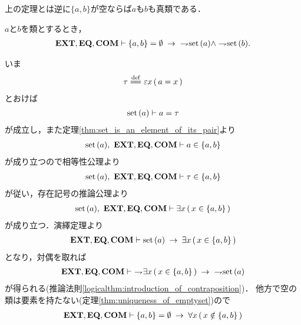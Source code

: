 	上の定理とは逆に$\{a,b\}$が空ならば$a$も$b$も真類である．
	
	\begin{screen}
		\begin{thm}[空な対に表示されている類は集合ではない]
		\label{thm:classes_displayed_in_empty_pair_are_not_sets}
			$a$と$b$を類とするとき，
			\begin{align}
				\EXTAX,\EQAX,\COMAX \vdash \{a,b\} = \emptyset \rarrow\ \negation \set{a} \wedge \negation \set{b}.
			\end{align}
		\end{thm}
	\end{screen}
	
	\begin{sketch}
		いま
		\begin{align}
			\tau \defeq \varepsilon x\, (\, a = x\, )
		\end{align}
		とおけば
		\begin{align}
			\operatorname*{set}\hspace{0.15em}(a) \vdash a = \tau
		\end{align}
		が成立し，また定理\ref{thm:set_is_an_element_of_its_pair}より
		\begin{align}
			\operatorname*{set}\hspace{0.15em}(a),\ \mbox{{\bf EXT}},\mbox{{\bf EQ}},\mbox{\bf COM} \vdash a \in \{a,b\}
		\end{align}
		が成り立つので相等性公理より
		\begin{align}
			\operatorname*{set}\hspace{0.15em}(a),\ \mbox{{\bf EXT}},\mbox{{\bf EQ}},\mbox{\bf COM} \vdash \tau \in \{a,b\}
		\end{align}
		が従い，存在記号の推論公理より
		\begin{align}
			\operatorname*{set}\hspace{0.15em}(a),\ \mbox{{\bf EXT}},\mbox{{\bf EQ}},\mbox{\bf COM} \vdash \exists x\, (\, x \in \{a,b\}\, )
		\end{align}
		が成り立つ．演繹定理より
		\begin{align}
			\mbox{{\bf EXT}},\mbox{{\bf EQ}},\mbox{\bf COM} \vdash \operatorname*{set}\hspace{0.15em}(a) \hspace{0.25em}\rightarrow\hspace{0.25em} \exists x\, (\, x \in \{a,b\}\, )
		\end{align}
		となり，対偶を取れば
		\begin{align}
			\mbox{{\bf EXT}},\mbox{{\bf EQ}},\mbox{\bf COM} \vdash\ \rightharpoondown\hspace{-0.25em} \exists x\, (\, x \in \{a,b\}\, )
			\hspace{0.25em}\rightarrow\hspace{0.25em}\ \rightharpoondown\hspace{-0.25em} \operatorname*{set}\hspace{0.15em}(a)
			\label{fom:classes_displayed_in_empty_pair_are_not_sets_1}
		\end{align}
		が得られる(推論法則\ref{logicalthm:introduction_of_contraposition})．
		他方で空の類は要素を持たない(定理\ref{thm:uniqueness_of_emptyset})ので
		\begin{align}
			\mbox{{\bf EXT}},\mbox{{\bf EQ}},\mbox{\bf COM} \vdash \{a,b\} = \emptyset \hspace{0.25em}\rightarrow\hspace{0.25em} \forall x\, (\, x \notin \{a,b\}\, )
			\label{fom:classes_displayed_in_empty_pair_are_not_sets_2}
		\end{align}

\end{sketch}
